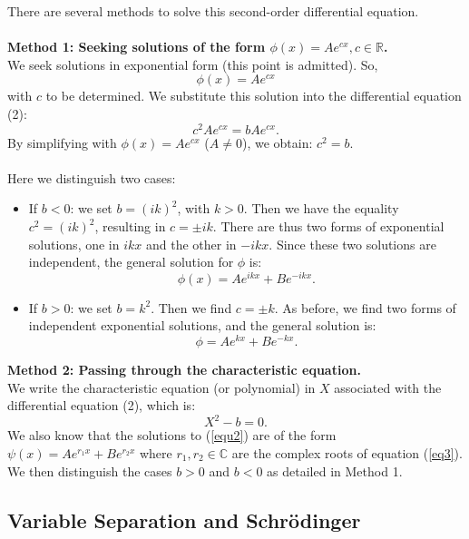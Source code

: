 \begin{breakbox}

\noindent There are several methods to solve this second-order differential equation.\\ \\
\noindent \textbf{Method 1: Seeking solutions of the form $\phi (x) = Ae^{cx}, c \in \mathbb{R}$.}\\
We seek solutions in exponential form (this point is admitted). So, $$\phi (x) = Ae^{cx}$$ with $c$ to be determined.
We substitute this solution into the differential equation (2): $$c^2Ae^{cx} = b Ae^{cx}.$$
By simplifying with $\phi (x)= Ae^{cx}$ ($A \neq 0$), we obtain: $c^2 = b$. \\ \\Here we distinguish two cases:

\begin{itemize}
    \item If $b<0$: we set $b=(ik)^2$, with $k > 0$. Then we have the equality $c^2 = (ik)^2$, 
resulting in $c = \pm ik$. There are thus two forms of exponential solutions, one in $ikx$ and the other in $-ikx$. Since these two solutions are independent, the general solution for $\phi$ is: $$\boxed{\phi(x) = Ae^{ikx} + Be^{-ikx}.}$$
    \item If $b>0$: we set $b=k^2$. Then we find $c = \pm k$.
As before, we find two forms of independent exponential solutions, and the general solution is: $$\boxed{\phi = Ae^{kx} + Be^{-kx}.}$$
\end{itemize}
\textbf{Method 2: Passing through the characteristic equation.}\\
We write the characteristic equation (or polynomial) in $X$ associated with the differential equation (2), which is:
\begin{equation}
    X^2 - b = 0.
    \label{eq3}
\end{equation}
We also know that the solutions to (\ref{equ2}) are of the form $\psi(x) = Ae^{r_1x}+Be^{r_2x}$ where $r_1, r_2 \in \mathbb{C}$ are the complex roots of equation (\ref{eq3}).\\
We then distinguish the cases $b >0$ and $b<0$ as detailed in Method 1.

\end{breakbox}

\subsection{Variable Separation and Schrödinger}

